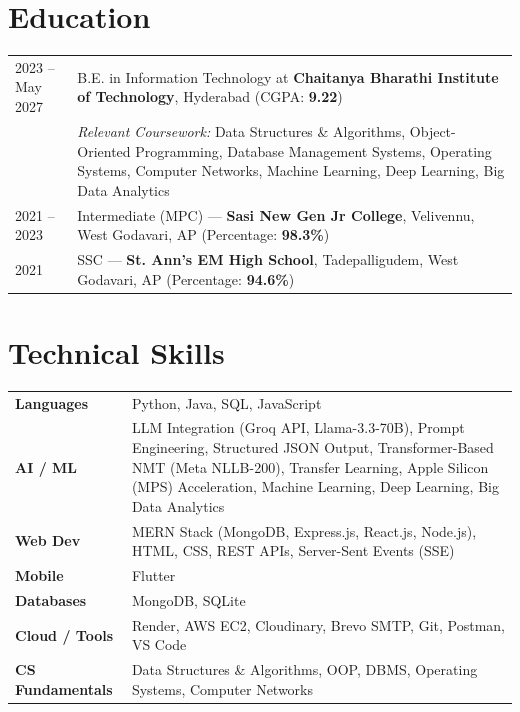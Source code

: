 \documentclass[a4paper,11pt]{article}
\begin{document}
\section{Education}
\vspace{2pt}
\begin{tabularx}{\linewidth}{@{}l X@{}}
2023 -- May 2027 & B.E. in Information Technology at \textbf{Chaitanya Bharathi Institute of Technology}, Hyderabad \hfill (CGPA: \textbf{9.22}) \\[3pt]
& \textit{Relevant Coursework:} Data Structures \& Algorithms, Object-Oriented Programming, Database Management Systems, Operating Systems, Computer Networks, Machine Learning, Deep Learning, Big Data Analytics \\[5pt]
2021 -- 2023 & Intermediate (MPC) --- \textbf{Sasi New Gen Jr College}, Velivennu, West Godavari, AP \hfill (Percentage: \textbf{98.3\%}) \\[5pt]
2021         & SSC --- \textbf{St. Ann's EM High School}, Tadepalligudem, West Godavari, AP \hfill (Percentage: \textbf{94.6\%}) \\
\end{tabularx}

\section{Technical Skills}
\vspace{2pt}
\begin{tabularx}{\linewidth}{@{}l X@{}}
\textbf{Languages}       & Python, Java, SQL, JavaScript \\[2pt]
\textbf{AI / ML}         & LLM Integration (Groq API, Llama-3.3-70B), Prompt Engineering, Structured JSON Output, Transformer-Based NMT (Meta NLLB-200), Transfer Learning, Apple Silicon (MPS) Acceleration, Machine Learning, Deep Learning, Big Data Analytics \\[2pt]
\textbf{Web Dev}         & MERN Stack (MongoDB, Express.js, React.js, Node.js), HTML, CSS, REST APIs, Server-Sent Events (SSE) \\[2pt]
\textbf{Mobile}          & Flutter \\[2pt]
\textbf{Databases}       & MongoDB, SQLite \\[2pt]
\textbf{Cloud / Tools}   & Render, AWS EC2, Cloudinary, Brevo SMTP, Git, Postman, VS Code \\[2pt]
\textbf{CS Fundamentals} & Data Structures \& Algorithms, OOP, DBMS, Operating Systems, Computer Networks \\
\end{tabularx}
\end{document}
